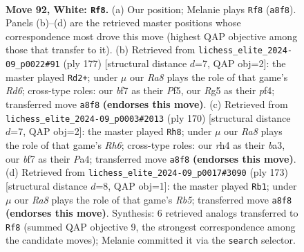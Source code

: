 \documentclass[11pt]{article}
\begin{document}
\clearpage

\begin{figure}[p]\centering
\begin{subfigure}{0.46\textwidth}\centering
\resizebox{\linewidth}{!}{%
\newchessgame
\chessboard[
  setfen={R7/3k1b2/1P6/6R1/7r/5K2/8/8 w - - 3 92},
  showmover=false,
  pgfstyle=straightmove, color=movearrow, markmove={a8-f8}
]}
\caption{}
\end{subfigure}\hfill
\begin{subfigure}{0.46\textwidth}\centering
\resizebox{\linewidth}{!}{%
\newchessgame
\chessboard[
  setfen={8/8/2k5/5p2/5P2/3r4/5K2/1R6 b - - 47 89},
  showmover=false,
  pgfstyle=straightmove, color=movearrow, markmove={d3-d2}
]}
\caption{}
\end{subfigure}
\\[4pt]
\begin{subfigure}{0.46\textwidth}\centering
\resizebox{\linewidth}{!}{%
\newchessgame
\chessboard[
  setfen={8/2k5/7R/p2K4/P7/b7/8/8 w - - 34 86},
  showmover=false,
  pgfstyle=straightmove, color=movearrow, markmove={h6-h8}
]}
\caption{}
\end{subfigure}\hfill
\begin{subfigure}{0.46\textwidth}\centering
\resizebox{\linewidth}{!}{%
\newchessgame
\chessboard[
  setfen={8/5B2/7k/4K3/1r6/8/6R1/8 b - - 38 87},
  showmover=false,
  pgfstyle=straightmove, color=movearrow, markmove={b4-b1}
]}
\caption{}
\end{subfigure}
\caption{\textbf{Move 92, White: \texttt{Rf8}.} (a) Our position; Melanie plays \texttt{Rf8} (\texttt{a8f8}). Panels (b)--(d) are the retrieved master positions whose correspondence most drove this move (highest QAP objective among those that transfer to it). (b) Retrieved from \texttt{lichess\_elite\_2024-09\_p0022\#91} (ply 177) [structural distance $d$=7, QAP obj=2]: the master played \texttt{Rd2+}; under $\mu$ our \emph{Ra8} plays the role of that game's \emph{Rd6}; cross-type roles: our \emph{b}f7 as their \emph{P}f5, our \emph{R}g5 as their \emph{p}f4; transferred move \texttt{a8f8} \textbf{(endorses this move)}. (c) Retrieved from \texttt{lichess\_elite\_2024-09\_p0003\#2013} (ply 170) [structural distance $d$=7, QAP obj=2]: the master played \texttt{Rh8}; under $\mu$ our \emph{Ra8} plays the role of that game's \emph{Rh6}; cross-type roles: our \emph{r}h4 as their \emph{b}a3, our \emph{b}f7 as their \emph{P}a4; transferred move \texttt{a8f8} \textbf{(endorses this move)}. (d) Retrieved from \texttt{lichess\_elite\_2024-09\_p0017\#3090} (ply 173) [structural distance $d$=8, QAP obj=1]: the master played \texttt{Rb1}; under $\mu$ our \emph{Ra8} plays the role of that game's \emph{Rb5}; transferred move \texttt{a8f8} \textbf{(endorses this move)}. Synthesis: 6 retrieved analogs transferred to \texttt{Rf8} (summed QAP objective 9, the strongest correspondence among the candidate moves); Melanie committed it via the \texttt{search} selector.}
\label{fig:thought-m182}
\end{figure}
\end{document}

